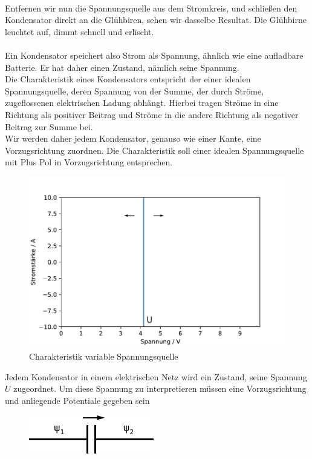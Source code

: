 \documentclass[11pt,a4paper,leqno]{report}
\numberwithin{equation}{chapter}
\begin{document}
 \\
 Entfernen wir nun die Spannungsquelle aus dem Stromkreis, und schlie\ss{}en den Kondensator direkt an die Gl\"uhbiren, sehen wir dasselbe Resultat. Die Gl\"uhbirne leuchtet auf, dimmt schnell und erlischt.\\
 \\
 Ein Kondensator speichert also Strom als Spannung, \"ahnlich wie eine aufladbare Batterie. Er hat daher einen Zustand, n\"amlich seine Spannung. \\
 Die Charakteristik eines Kondensators entspricht der einer idealen Spannungsquelle, deren Spannung von der Summe, der durch Str\"ome, zugeflossenen elektrischen Ladung abh\"angt. Hierbei tragen Str\"ome in eine Richtung als positiver Beitrag und Str\"ome in die andere Richtung als negativer Beitrag zur Summe bei.\\
 Wir werden daher jedem Kondensator, genauso wie einer Kante, eine Vorzugsrichtung zuordnen. Die Charakteristik soll einer idealen Spannungsquelle mit Plus Pol in Vorzugsrichtung entsprechen.
  \begin{figure}[H]
 	\begin{center}
 		\includegraphics[scale=0.5]{Bilder/variable_Spannungsquelle.pdf}
 		\caption{Charakteristik variable Spannungsquelle}
 	\end{center}
 \end{figure}
 \noindent
Jedem Kondensator in einem elektrischen Netz wird ein Zustand, seine Spannung $U$ zugeordnet. Um diese Spannung zu interpretieren m\"ussen eine Vorzugsrichtung und anliegende Potentiale gegeben sein
  \begin{figure}[H]
	\begin{center}
		\includegraphics[scale=1]{Bilder/kkondens.pdf}
	\end{center}
\end{figure}
\end{document}
